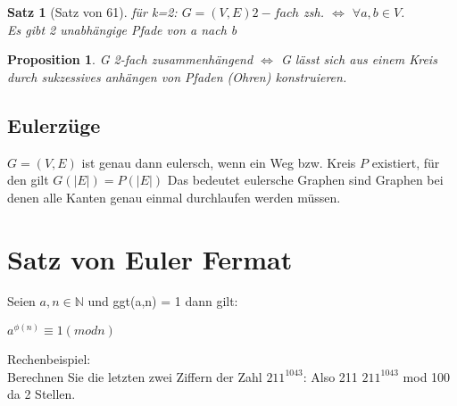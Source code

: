 \documentclass[12pt, letterpaper, twoside]{article}
\newtheorem{theorem}{Satz}[section]
\newtheorem{proposition}{Proposition}[section]
\newcommand{\forallin}[2]{$ \forall #1 \in #2 $}
\begin{document}
\begin{theorem}[Satz von 61]
für k=2: $G=(V,E) 2-fach$ zsh. $ \Leftrightarrow $ \forallin{a, b}{V}. \\
Es gibt 2 unabhängige Pfade von a nach b
 \end{theorem}
 \begin{proposition}
	 G 2-fach zusammenhängend $\Leftrightarrow$ G lässt sich aus einem Kreis durch sukzessives anhängen von Pfaden (Ohren) konstruieren.
 \end{proposition}

 \subsection{Eulerzüge}
 $G=(V,E)$ ist genau dann eulersch, wenn ein Weg bzw. Kreis $P$ existiert, für den gilt $G( |E| )=P( |E| )$
 Das bedeutet eulersche Graphen sind Graphen bei denen alle Kanten genau einmal durchlaufen werden müssen.

\section{Satz von Euler Fermat}
Seien $ a,n \in  \mathbb{N} $ und ggt(a,n) = 1 dann gilt: \\
\begin{center}
$ a^{\phi (n)} \equiv 1 (mod n) $ \\
\end{center}
Rechenbeispiel: \\
Berechnen Sie die letzten zwei Ziffern der Zahl $ 211^{1043} $:
Also 211 $ 211^{1043} $ mod 100 da 2 Stellen.
\end{document}
